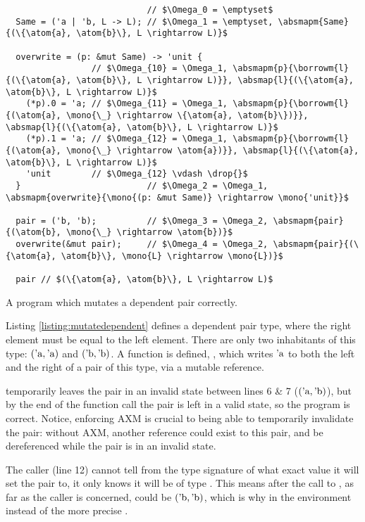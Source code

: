 \documentclass[12pt,twoside]{report}
\begin{document}
\begin{listing}
\begin{verbatim}
                            // $\Omega_0 = \emptyset$
  Same = ('a | 'b, L -> L); // $\Omega_1 = \emptyset, \absmapm{Same}{(\{\atom{a}, \atom{b}\}, L \rightarrow L)}$

  overwrite = (p: &mut Same) -> 'unit {
                 // $\Omega_{10} = \Omega_1, \absmapm{p}{\borrowm{l}{(\{\atom{a}, \atom{b}\}, L \rightarrow L)}}, \absmap{l}{(\{\atom{a}, \atom{b}\}, L \rightarrow L)}$
    (*p).0 = 'a; // $\Omega_{11} = \Omega_1, \absmapm{p}{\borrowm{l}{(\atom{a}, \mono{\_} \rightarrow \{\atom{a}, \atom{b}\})}}, \absmap{l}{(\{\atom{a}, \atom{b}\}, L \rightarrow L)}$
    (*p).1 = 'a; // $\Omega_{12} = \Omega_1, \absmapm{p}{\borrowm{l}{(\atom{a}, \mono{\_} \rightarrow \atom{a})}}, \absmap{l}{(\{\atom{a}, \atom{b}\}, L \rightarrow L)}$
    'unit        // $\Omega_{12} \vdash \drop{}$
  }                         // $\Omega_2 = \Omega_1, \absmapm{overwrite}{\mono{(p: &mut Same)} \rightarrow \mono{'unit}}$

  pair = ('b, 'b);          // $\Omega_3 = \Omega_2, \absmapm{pair}{(\atom{b}, \mono{\_} \rightarrow \atom{b})}$
  overwrite(&mut pair);     // $\Omega_4 = \Omega_2, \absmapm{pair}{(\{\atom{a}, \atom{b}\}, \mono{L} \rightarrow \mono{L})}$

  pair // $(\{\atom{a}, \atom{b}\}, L \rightarrow L)$
\end{verbatim}
\caption{A program which mutates a dependent pair correctly.}
\label{listing:mutatedependent}
\end{listing}

Listing \ref{listing:mutatedependent} defines a dependent pair type, where the right element must be equal to the left element. There are only two inhabitants of this type: $(\text{'a}, \text{'a})$ and $(\text{'b}, \text{'b})$. A function is defined, , which writes $\text{'a}$ to both the left and the right of a pair of this type, via a mutable reference.

 temporarily leaves the pair in an invalid state between lines 6 \& 7 ($(\text{'a}, \text{'b})$), but by the end of the function call the pair is left in a valid state, so the program is correct. Notice, enforcing AXM is crucial to being able to temporarily invalidate the pair: without AXM, another reference could exist to this pair, and be dereferenced while the pair is in an invalid state.

The caller (line 12) cannot tell from the type signature of  what exact value it will set the pair to, it only knows it will be of type . This means after the call to , as far as the caller is concerned,  could be $(\text{'b}, \text{'b})$, which is why  in the environment instead of the more precise .
\end{document}

